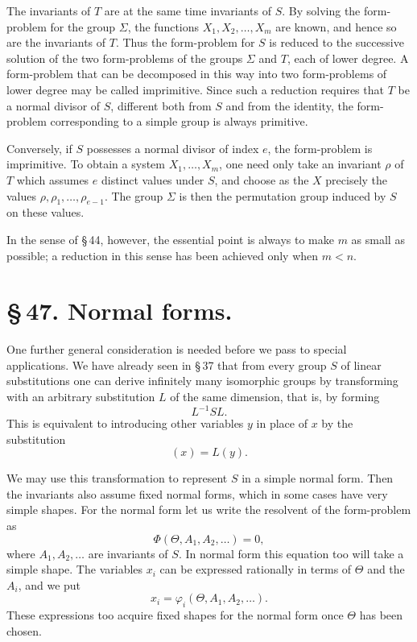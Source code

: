 \documentclass[11pt]{article}
\begin{document}
The invariants of $T$ are at the same time invariants of $S$. By solving the form-problem for the group $\Sigma$, the functions $X_1,X_2,
\ldots,X_m$ are known, and hence so are the invariants of $T$. Thus the form-problem for $S$ is reduced to the successive solution of the two form-problems of the groups $\Sigma$ and $T$, each of lower degree. A form-problem that can be decomposed in this way into two form-problems of lower degree may be called imprimitive. Since such a reduction requires that $T$ be a normal divisor of $S$, different both from $S$ and from the identity, the form-problem corresponding to a simple group is always primitive.

Conversely, if $S$ possesses a normal divisor of index $e$, the form-problem is imprimitive. To obtain a system $X_1,\ldots,X_m$, one need only take an invariant $\rho$ of $T$ which assumes $e$ distinct values under $S$, and choose as the $X$ precisely the values $\rho,\rho_1,\ldots,\rho_{e-1}$. The group $\Sigma$ is then the permutation group induced by $S$ on these values.

In the sense of \S\,44, however, the essential point is always to make $m$ as small as possible; a reduction in this sense has been achieved only when $m<n$.

\section*{\S\,47. Normal forms.}

One further general consideration is needed before we pass to special applications. We have already seen in \S\,37 that from every group $S$ of linear substitutions one can derive infinitely many isomorphic groups by transforming with an arbitrary substitution $L$ of the same dimension, that is, by forming
\begin{equation}
L^{-1}SL.
\tag{1}
\end{equation}
This is equivalent to introducing other variables $y$ in place of $x$ by the substitution
\begin{equation}
(x)=L(y).
\tag{2}
\end{equation}

We may use this transformation to represent $S$ in a simple normal form. Then the invariants also assume fixed normal forms, which in some cases have very simple shapes. For the normal form let us write the resolvent of the form-problem as
\begin{equation}
\Phi(\Theta,A_1,A_2,\ldots)=0,
\tag{3}
\end{equation}
where $A_1,A_2,\ldots$ are invariants of $S$. In normal form this equation too will take a simple shape. The variables $x_i$ can be expressed rationally in terms of $\Theta$ and the $A_i$, and we put
\begin{equation}
x_i=\varphi_i(\Theta,A_1,A_2,\ldots).
\tag{4}
\end{equation}
These expressions too acquire fixed shapes for the normal form once $\Theta$ has been chosen.
\end{document}
